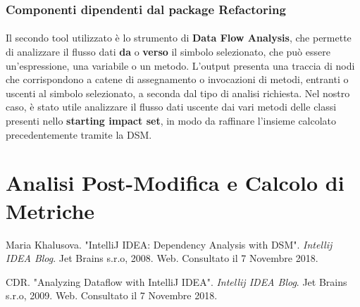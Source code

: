 	\subsubsection{Componenti dipendenti dal package Refactoring}
	
	
	
	\paragraph{} Il secondo tool utilizzato è lo strumento di \textbf{Data Flow Analysis}, che permette di analizzare il flusso dati \textbf{da} o \textbf{verso} il simbolo selezionato, che può essere un'espressione, una variabile o un metodo. L'output presenta una traccia di nodi che corrispondono a catene di assegnamento o invocazioni di metodi, entranti o uscenti al simbolo selezionato, a seconda dal tipo di analisi richiesta. Nel nostro caso, è stato utile analizzare il flusso dati uscente dai vari metodi delle classi presenti nello \textbf{starting impact set}, in modo da raffinare l'insieme calcolato precedentemente tramite la DSM.
	
	\section{Analisi Post-Modifica e Calcolo di Metriche}
	
	\newpage
	
	\begin{thebibliography}{9}
		
		 Maria Khalusova. "IntelliJ IDEA: Dependency Analysis with DSM".
		\textit{Intellij IDEA Blog}. Jet Brains s.r.o, 2008. Web. Consultato il 7 Novembre 2018.
		
		 CDR. "Analyzing Dataflow with IntelliJ IDEA".
		\textit{Intellij IDEA Blog}. Jet Brains s.r.o, 2009. Web. Consultato il 7 Novembre 2018.
	\end{thebibliography}
	
	

